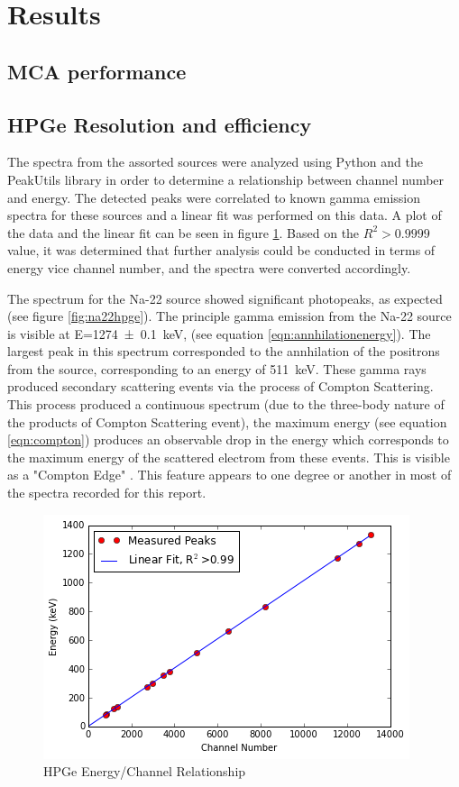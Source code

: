 \documentclass[12pt]{article}
\begin{document}
\section{Results}
\subsection{MCA performance}

\subsection{HPGe Resolution and efficiency}
The spectra from the assorted sources were analyzed using Python and the PeakUtils library \cite{peakutils} in order to determine a relationship between channel number and energy. The detected peaks were correlated to known gamma emission spectra for these sources and a linear fit was performed on this data. A plot of the data and the linear fit can be seen in figure \ref{fig:hpgeenergytochannel}. Based on the $R^2>0.9999$ value, it was determined that further analysis could be conducted in terms of energy vice channel number, and the spectra were converted accordingly.

The spectrum for the Na-22 source showed significant photopeaks, as expected (see figure \ref{fig:na22hpge}). The principle gamma emission from the Na-22 source is visible at E=\SI{1274 \pm 0.1}{\kilo\electronvolt}, (see equation \ref{eqn:annhilationenergy}). The largest peak in this spectrum corresponded to the annhilation of the positrons from the source, corresponding to an energy of \SI{511}{\kilo\electronvolt}. These gamma rays produced secondary scattering events via the process of Compton Scattering. This process produced a continuous spectrum (due to the three-body nature of the products of Compton Scattering event), the maximum energy (see equation \ref{eqn:compton}) produces an observable drop in the energy which corresponds to the maximum energy of the scattered electrom from these events. This is visible as a "Compton Edge" \cite{textbook}. This feature appears to one degree or another in most of the spectra recorded for this report.

\begin{center}
\begin{figure}
	\includegraphics{hpge_energy_linearity}
	\caption{HPGe Energy/Channel Relationship}
	\label{fig:hpgeenergytochannel}
\end{figure}
\end{center}
\end{document}
